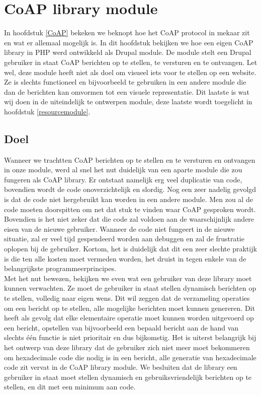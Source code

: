 \chapter{CoAP library module}

In hoofdstuk \ref{CoAP} bekeken we beknopt hoe het CoAP protocol in mekaar zit en wat er allemaal mogelijk is. In dit hoofdstuk bekijken we hoe een eigen CoAP library in PHP werd ontwikkeld als Drupal module. De module stelt een Drupal gebruiker in staat CoAP berichten op te stellen, te versturen en te ontvangen. Let wel, deze module heeft niet als doel om visueel iets voor te stellen op een website. Ze is slechts functioneel en bijvoorbeeld te gebruiken in een andere module die dan de berichten kan omvormen tot een visuele representatie. Dit laatste is wat wij doen in de uiteindelijk te ontwerpen module, deze laatste wordt toegelicht in hoofdstuk \ref{resourcemodule}.

\section{Doel}

Wanneer we trachtten CoAP berichten op te stellen en te versturen en ontvangen in onze module, werd al snel het nut duidelijk van een aparte module die zou fungeren als CoAP library. Er ontstaat namelijk erg veel duplicatie van code, bovendien wordt de code onoverzichtelijk en slordig. Nog een zeer nadelig gevolgd is dat de code niet hergebruikt kan worden in een andere module. Men zou al de code moeten doorspitten om net dat stuk te vinden waar CoAP gesproken wordt. Bovendien is het niet zeker dat die code zal voldoen aan de waarschijnlijk andere eisen van de nieuwe gebruiker. Wanneer de code niet fungeert in de nieuwe situatie, zal er veel tijd gespendeerd worden aan debuggen en zal de frustratie oplopen bij de gebruiker. Kortom, het is duidelijk dat dit een zeer slechte praktijk is die ten alle kosten moet vermeden worden, het druist in tegen enkele van de belangrijkste programmeerprincipes.\\

Met het nut bewezen, bekijken we even wat een gebruiker van deze library moet kunnen verwachten. Ze moet de gebruiker in staat stellen dynamisch berichten op te stellen, volledig naar eigen wens. Dit wil zeggen dat de verzameling operaties om een bericht op te stellen, alle mogelijke berichten moet kunnen genereren. Dit heeft als gevolg dat elke elementaire operatie moet kunnen worden uitgevoerd op een bericht, opstellen van bijvoorbeeld een bepaald bericht aan de hand van slechts één functie is niet prioritair en dus bijkomstig. Het is uiterst belangrijk bij het ontwerp van deze library dat de gebruiker zich niet meer moet bekommeren om hexadecimale code die nodig is in een bericht, alle generatie van hexadecimale code zit vervat in de CoAP library module. We besluiten dat de library een gebruiker in staat moet stellen dynamisch en gebruiksvriendelijk berichten op te stellen, en dit met een minimum aan code.

